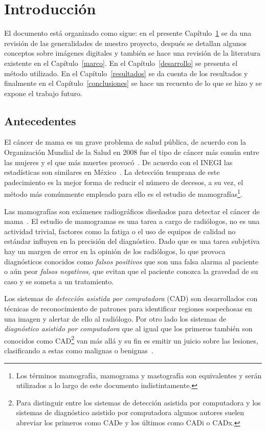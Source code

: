 \chapter{Introducción}
\label{generalidades}
 \setcounter{page}{1}

El documento está organizado como sigue: en el presente
Capítulo~\ref{generalidades} se da una revisión de las generalidades de nuestro
proyecto, después se detallan algunos conceptos sobre imágenes digitales y
también se hace una revisión de la literatura existente en el
Capítulo~\ref{marco}. En el Capítulo~\ref{desarrollo} se presenta el método
utilizado. En el Capítulo~\ref{resultados} se da cuenta de los resultados y
finalmente en el Capítulo~\ref{conclusiones} se hace un recuento de lo que se
hizo y se expone el trabajo futuro.

\section{Antecedentes}

El cáncer de mama es un grave problema de salud pública, de acuerdo con la
Organización Mundial de la Salud en 2008 fue el tipo de cáncer más común entre
las mujeres y el que más muertes provocó~\cite{cancerreport}. De acuerdo con el
INEGI las estadísticas son similares en México~\cite{mxcancer, inegi}. La
detección temprana de este padecimiento es la mejor forma de reducir el número
de decesos, a su vez, el método más comúnmente empleado para ello es el estudio
de mamografías\footnote{Los términos mamografía, mamograma y mastografía son
equivalentes y serán utilizados a lo largo de este documento indistintamente.}. 

Las mamografías son exámenes radiográficos diseñados para detectar el cáncer de
mama~\cite{bushberg2011essential}. El estudio de mamogramas es una tarea a
cargo de radiólogos, no es una actividad trivial, factores como la fatiga o el
uso de equipos de calidad no estándar influyen en la precisión del diagnóstico.
Dado que es una tarea subjetiva hay un margen de error en la opinión de los
radiólogos, lo que provoca diagnósticos conocidos como \textit{falsos
positivos} que son una falsa alarma al paciente o aún peor \textit{falsos
negativos}, que evitan que el paciente conozca la gravedad de su caso y se
someta a un tratamiento.

Los sistemas de \textit{detección asistida por computadora} (CAD) son
desarrollados con técnicas de reconocimiento de patrones para identificar
regiones sospechosas en una imagen y alertar de ello al radiólogo. Por otro
lado los sistemas de \textit{diagnóstico asistido por computadora} que al igual
que los primeros también son conocidos como CAD\footnote{Para distinguir entre
los sistemas de detección asistida por computadora y los sistemas de
diagnóstico asistido por computadora algunos autores suelen abreviar los
primeros como CADe y los últimos como CADi o CADx.} van más allá y su fin es
emitir un juicio sobre las lesiones, clasificando a estas como malignas o
benignas~\cite{castellino2005computer}. 

